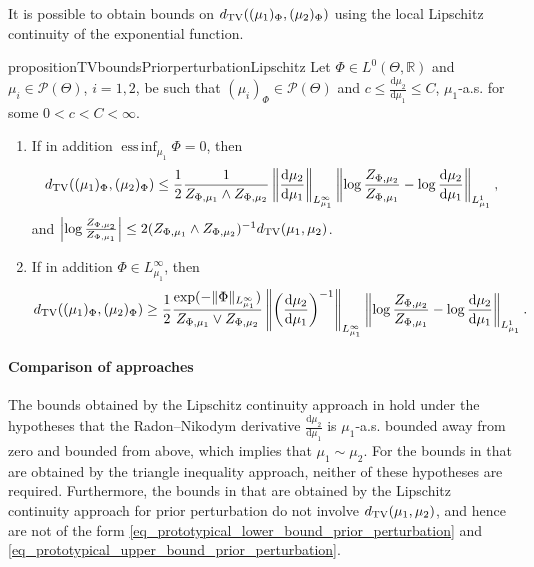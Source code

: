 \documentclass[a4paper]{scrartcl}
\theoremstyle{definition}
\numberwithin{equation}{section}
\newcommand{\R}{\mathbb{R}}
\newcommand{\rd}{\mathrm{d}}
\DeclareMathOperator*{\essinf}{ess\,inf}
\newcommand{\Abs}[1]{\left\vert#1\right\vert}
\newcommand{\norm}[1]{\Vert #1 \Vert}
\newcommand{\Norm}[1]{\left\Vert #1 \right\Vert}
\newcommand{\TV}[0]{\textup{TV}}
\begin{document}
It is possible to obtain bounds on $d_{\TV}((\mu_1)_\Phi,(\mu_2)_\Phi)$ using the local Lipschitz continuity of the exponential function.
\begin{restatable}{proposition}{TVboundsPriorperturbationLipschitz}
Let $\Phi\in L^0(\Theta,\R)$ and $\mu_i\in\mathcal{P}(\Theta)$, $i=1,2$, be such that $(\mu_i)_\Phi\in\mathcal{P}(\Theta)$ and $c\leq \tfrac{\rd\mu_2}{\rd\mu_1}\leq C$, $\mu_1$-a.s. for some $0<c<C<\infty$.
 \label{proposition_TV_bounds_prior_perturbations_via_Lipschitz_continuity}
 \begin{enumerate}
  \item \label{proposition_TV_bounds_prior_perturbations_via_Lipschitz_continuity_upper_bound}
   If in addition $\essinf_{\mu_1}\Phi=0$, then
  \begin{equation*}
  d_{\TV}((\mu_1)_\Phi,(\mu_2)_\Phi)\leq \frac{1}{2}\frac{1}{Z_{\Phi,\mu_1}\wedge Z_{\Phi,\mu_2}}\Norm{\frac{\rd\mu_2}{\rd \mu_1}}_{L^\infty_{\mu_1}} \Norm{\log \frac{Z_{\Phi,\mu_2}}{Z_{\Phi,\mu_1}}-\log\frac{\rd \mu_2}{\rd \mu_1} }_{L^1_{\mu_1}},
  \end{equation*}
  and $\Abs{\log \tfrac{Z_{\Phi,\mu_2}}{Z_{\Phi,\mu_1}}}\leq 2(Z_{\Phi,\mu_1}\wedge Z_{\Phi,\mu_2})^{-1}d_{\TV}(\mu_1,\mu_2)$.
  \item \label{proposition_TV_bounds_prior_perturbations_via_Lipschitz_continuity_lower_bound}
  If in addition $\Phi\in L^\infty_{\mu_1}$, then
  \begin{equation*}
   d_{\TV}((\mu_1)_\Phi,(\mu_2)_\Phi)\geq\frac{1}{2}\frac{\exp(-\norm{\Phi}_{L^\infty_{\mu_1}}) }{Z_{\Phi,\mu_1}\vee Z_{\Phi,\mu_2}}\Norm{\left(\frac{\rd\mu_2}{\rd \mu_1}\right)^{-1}}_{L^\infty_{\mu_1}}\Norm{\log \frac{Z_{\Phi,\mu_2}}{Z_{\Phi,\mu_1}}-\log\frac{\rd \mu_2}{\rd \mu_1} }_{L^1_{\mu_1}}.
  \end{equation*}
 \end{enumerate}
\end{restatable}

\paragraph{Comparison of approaches} The bounds obtained by the Lipschitz continuity approach in   hold under the hypotheses that the Radon--Nikodym derivative $\tfrac{\rd\mu_2}{\rd\mu_1}$ is $\mu_1$-a.s. bounded away from zero and bounded from above, which implies that $\mu_1\sim\mu_2$.  
For the bounds in  that are obtained by the triangle inequality approach, neither of these hypotheses are required.
Furthermore, the bounds in  that are obtained by the Lipschitz continuity approach for prior perturbation do not involve $d_{\TV}(\mu_1,\mu_2)$, and hence are not of the form \eqref{eq_prototypical_lower_bound_prior_perturbation} and \eqref{eq_prototypical_upper_bound_prior_perturbation}.
\end{document}
